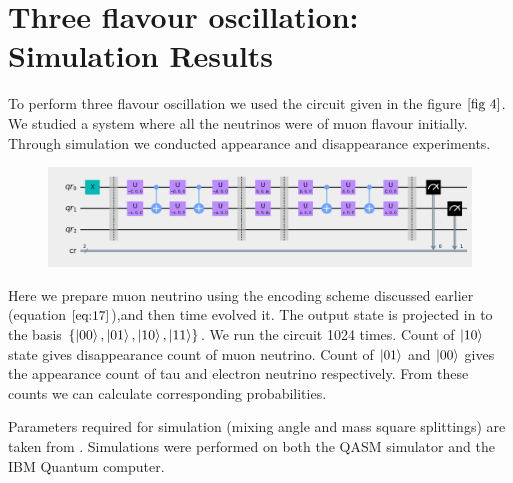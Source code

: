 \documentclass[12pt,a4paper]{report}
\begin{document}
\section{Three flavour oscillation: Simulation Results}
To perform three flavour oscillation we used the circuit given in the figure $\ref{fig 4}$. We studied a system where all the neutrinos were of muon flavour initially. Through simulation we conducted appearance and disappearance experiments.
\begin{figure}[H]
\graphicspath{ {./Images/} }
\centering	
{\includegraphics[width=\textwidth]{fig_7.png}}
\end{figure}\par
Here we prepare muon neutrino using the encoding scheme discussed earlier (equation $\ref{eq:17}$),and then time evolved it. The output state is projected in to the basis $\{\ket{00},\ket{01},\ket{10},\ket{11}\}$. We run the circuit 1024 times.  Count of $\ket{10}$ state gives disappearance count of muon neutrino. Count of $\ket{01}$ and $\ket{00}$ gives the appearance count of tau and electron neutrino respectively. From these counts we can calculate corresponding probabilities.

Parameters required for simulation (mixing angle and mass square splittings) are taken from \cite{estaban}.  Simulations were performed on both the QASM simulator and the IBM Quantum computer.
\end{document}
